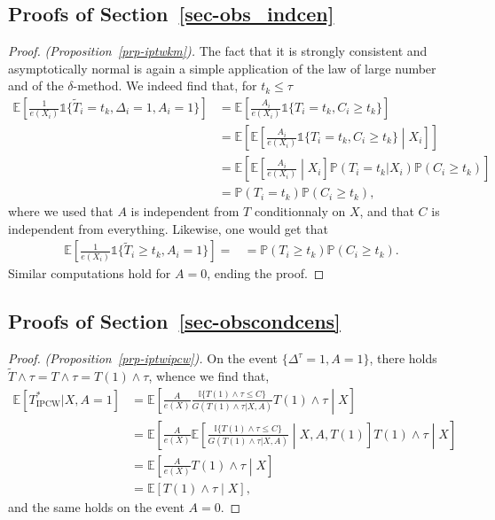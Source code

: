 \documentclass[
  11pt,
  a4paper,
]{article}
\theoremstyle{plain}
\theoremstyle{plain}
\theoremstyle{plain}
\theoremstyle{definition}
\theoremstyle{remark}
\begin{document}
\subsection{\texorpdfstring{Proofs of
Section~\ref{sec-obs_indcen}}{Proofs of Section~}}\label{sec-proof31}

\begin{proof}
\emph{(Proposition~\ref{prp-iptwkm}).} The fact that it is strongly
consistent and asymptotically normal is again a simple application of
the law of large number and of the \(\delta\)-method. We indeed find
that, for \(t_k \leqslant\tau\) \[
\begin{aligned}
\mathbb{E}\left[\frac{1}{e(X_i)} \mathbb{1}\{\widetilde T_i = t_k, \Delta_i = 1, A_i=1\}\right] &= \mathbb{E}\left[\frac{A_i}{e(X_i)} \mathbb{1}\{T_i = t_k, C_i \geqslant t_k\}\right] \\
&=\mathbb{E}\left[ \mathbb{E}\left[ \frac{A_i}{e(X_i)} \mathbb{1}\{T_i = t_k, C_i \geqslant t_k\} \middle |X_i \right]\right] \\
&= \mathbb{E}\left[ \mathbb{E}\left[\frac{A_i}{e(X_i)}\middle | X_i\right] \mathbb{P}(T_i = t_k |X_i) \mathbb{P}( C_i \geqslant t_k)\right] \\
&= \mathbb{P}(T_i = t_k) \mathbb{P}( C_i \geqslant t_k),
\end{aligned}
\] where we used that \(A\) is independent from \(T\) conditionnaly on
\(X\), and that \(C\) is independent from everything. Likewise, one
would get that \[
\begin{aligned}
\mathbb{E}\left[\frac{1}{e(X_i)} \mathbb{1}\{\widetilde T_i \geqslant t_k, A_i=1\}\right] =
&= \mathbb{P}(T_i \geqslant t_k) \mathbb{P}( C_i \geqslant t_k).
\end{aligned}
\] Similar computations hold for \(A=0\), ending the proof.
\end{proof}

\subsection{\texorpdfstring{Proofs of
Section~\ref{sec-obscondcens}}{Proofs of Section~}}\label{sec-proof32}

\begin{proof}
\emph{(Proposition~\ref{prp-iptwipcw}).} On the event
\(\{\Delta^\tau=1, A=1\}\), there holds
\(\widetilde T \wedge \tau = T \wedge \tau = T(1) \wedge \tau\), whence
we find that, \[
\begin{aligned}
\mathbb{E}[ T^*_{\mathrm{IPCW}}|X,A=1] &= \mathbb{E}\left[\frac{A}{e(X)} \frac{\mathbb{I}\{T(1) \wedge \tau \leqslant C\}}{G(T(1) \wedge \tau|X,A)} T(1) \wedge \tau\middle|X\right] \\
&= \mathbb{E}\left[ \frac{A}{e(X)} \mathbb{E}\left[\frac{\mathbb{I}\{T(1) \wedge \tau \leqslant C\}}{G(T(1) \wedge \tau|X,A)} \middle| X,A, T(1) \right]T(1) \wedge \tau\middle|X\right] \\
&=\mathbb{E}\left[ \frac{A}{e(X)} T(1) \wedge \tau\middle|X\right] \\
&=\mathbb{E}\left[T(1) \wedge \tau\middle|X\right],
\end{aligned}
\] and the same holds on the event \(A=0\).
\end{proof}
\end{document}
